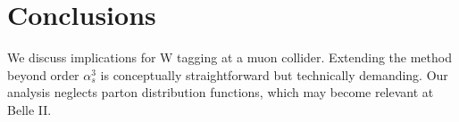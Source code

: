 \section{Conclusions}\label{sec:conclusions}

We discuss implications for W tagging at a muon collider. Extending the
method beyond order $\alpha_s^3$ is conceptually straightforward but
technically demanding. Our analysis neglects parton distribution
functions, which may become relevant at Belle II.

